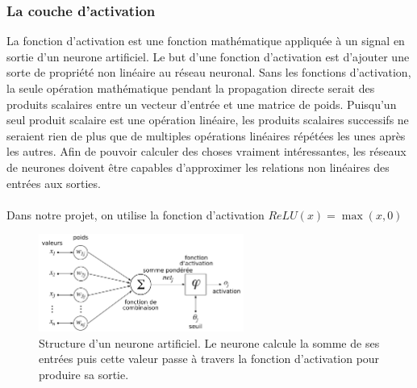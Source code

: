 \documentclass[12pt,a4paper]{article}
\begin{document}
\subsubsection{La couche d'activation}
La fonction d'activation est une fonction 
mathématique appliquée à
un signal en sortie d'un neurone artificiel.
Le but d'une fonction d'activation est d'ajouter une sorte de propriété non linéaire au réseau neuronal.
Sans les fonctions d'activation,
la seule opération mathématique pendant la propagation directe serait des produits scalaires entre un vecteur d'entrée et une matrice de poids.
Puisqu'un seul produit scalaire est une opération linéaire, les produits scalaires successifs ne seraient rien de plus que de multiples opérations linéaires répétées les unes après les autres.
Afin de pouvoir calculer des choses vraiment intéressantes,
les réseaux de neurones doivent être capables d'approximer les relations non linéaires des entrées aux sorties. \cite{deeplearning-academy}
\\\\
Dans notre projet, on utilise la fonction d'activation $ReLU(x) = \max(x, 0)$
\begin{figure}
  \includegraphics[width=0.6\textwidth]{neuron_model.png}
  \caption[Structure d'un neurone artificiel]{Structure d'un neurone artificiel. Le neurone calcule la somme de ses entrées puis cette valeur passe à travers la fonction d'activation pour produire sa sortie.}
  \label{fig:4}
\end{figure}
\end{document}
